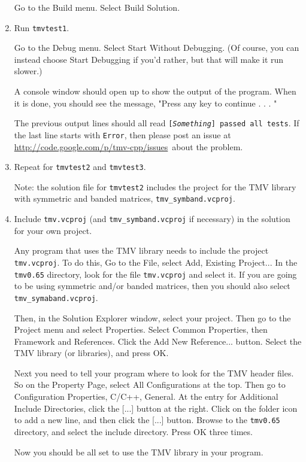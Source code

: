 \documentclass[twoside,letterpaper,11pt]{article}
\newcommand{\tmvversion}{0.65}
\newcommand{\myissuesx}{http://code.google.com/p/tmv-cpp/issues}
\newcommand{\myissues}{\url{\myissuesx}}
\begin{document}
\begin{enumerate}
Go to the Build menu.  Select Build Solution.

\item 
Run \texttt{tmvtest1}.

Go to the Debug menu.  Select Start Without Debugging.  (Of course, you can instead
choose Start Debugging if you'd rather, but that will make it run slower.)

A console window should open up to show the output of the program.  
When it is done, you should see the message,
"Press any key to continue . . . "

The previous output lines should all read \texttt{[{\em Something}] passed all tests}.
If the last line starts with \texttt{Error}, 
then please post an issue at \myissues\ about the problem.

\item
Repeat for \texttt{tmvtest2} and \texttt{tmvtest3}.  

Note: the solution file for \texttt{tmvtest2} includes the
project for the TMV library with symmetric and banded matrices, \texttt{tmv\_symband.vcproj}.

\item
Include \texttt{tmv.vcproj} (and \texttt{tmv\_symband.vcproj} if necessary) in the solution for your own project.

Any program that uses the TMV library needs to include the project \texttt{tmv.vcproj}.  To do this,
Go to the File, select Add, Existing Project...
In the \texttt{tmv\tmvversion} directory, look for the file
\texttt{tmv.vcproj} and select it.  If you are going to be using symmetric and/or banded matrices,
then you should also select \texttt{tmv\_symaband.vcproj}.

Then, in the Solution Explorer window, select your project.  Then go to the Project menu
and select Properties.  Select Common Properties, then Framework and References.  
Click the Add New Reference... button.  Select the TMV library (or libraries), and press OK.

Next you need to tell your program where to look for the TMV header files.  So on the Property Page,
select All Configurations at the top.  Then go to Configuration Properties, C/C++, General.
At the entry for Additional Include Directories, click the [...] button at the right.  Click on the folder icon
to add a new line, and then click the [...] button.  Browse to the 
\texttt{tmv\tmvversion} directory, and select the include directory.  Press OK three times.

Now you should be all set to use the TMV library in your program.

\end{enumerate}
\end{document}
